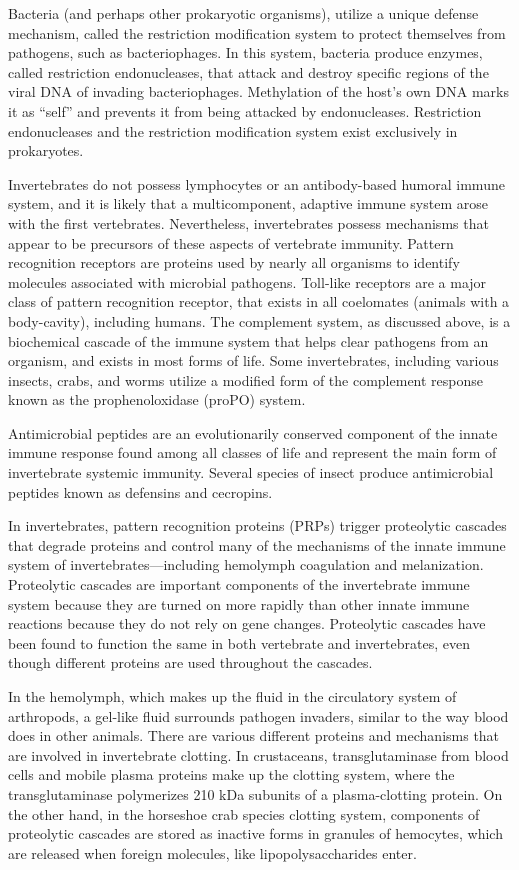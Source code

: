 Bacteria (and perhaps other prokaryotic organisms), utilize a unique defense mechanism, called the restriction modification system to protect themselves from pathogens, such as bacteriophages. In this system, bacteria produce enzymes, called restriction endonucleases, that attack and destroy specific regions of the viral DNA of invading bacteriophages. Methylation of the host's own DNA marks it as ``self'' and prevents it from being attacked by endonucleases. Restriction endonucleases and the restriction modification system exist exclusively in prokaryotes.

Invertebrates do not possess lymphocytes or an antibody-based humoral immune system, and it is likely that a multicomponent, adaptive immune system arose with the first vertebrates. Nevertheless, invertebrates possess mechanisms that appear to be precursors of these aspects of vertebrate immunity. Pattern recognition receptors are proteins used by nearly all organisms to identify molecules associated with microbial pathogens. Toll-like receptors are a major class of pattern recognition receptor, that exists in all coelomates (animals with a body-cavity), including humans. The complement system, as discussed above, is a biochemical cascade of the immune system that helps clear pathogens from an organism, and exists in most forms of life. Some invertebrates, including various insects, crabs, and worms utilize a modified form of the complement response known as the prophenoloxidase (proPO) system.

Antimicrobial peptides are an evolutionarily conserved component of the innate immune response found among all classes of life and represent the main form of invertebrate systemic immunity. Several species of insect produce antimicrobial peptides known as defensins and cecropins.

In invertebrates, pattern recognition proteins (PRPs) trigger proteolytic cascades that degrade proteins and control many of the mechanisms of the innate immune system of invertebrates---including hemolymph coagulation and melanization. Proteolytic cascades are important components of the invertebrate immune system because they are turned on more rapidly than other innate immune reactions because they do not rely on gene changes. Proteolytic cascades have been found to function the same in both vertebrate and invertebrates, even though different proteins are used throughout the cascades.

In the hemolymph, which makes up the fluid in the circulatory system of arthropods, a gel-like fluid surrounds pathogen invaders, similar to the way blood does in other animals. There are various different proteins and mechanisms that are involved in invertebrate clotting. In crustaceans, transglutaminase from blood cells and mobile plasma proteins make up the clotting system, where the transglutaminase polymerizes 210 kDa subunits of a plasma-clotting protein. On the other hand, in the horseshoe crab species clotting system, components of proteolytic cascades are stored as inactive forms in granules of hemocytes, which are released when foreign molecules, like lipopolysaccharides enter.

